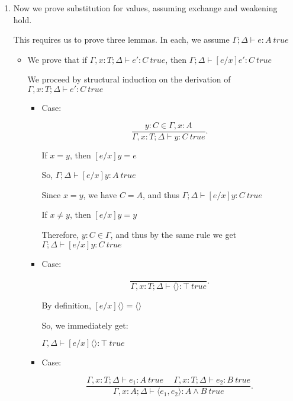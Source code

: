 \begin{enumerate}
      \item
        Now we prove substitution for values, assuming exchange and weakening hold.

        This requires us to prove three lemmas. In each, we assume $\Gamma;\Delta \vdash e: A\ true$

        \begin{itemize}

          \item
            We prove that if $\Gamma, x : T; \Delta \vdash e': C\ true$, then $\Gamma;\Delta \vdash [e / x]e' : C\ true$

            We proceed by structural induction on the derivation of $\Gamma, x : T;\Delta \vdash e': C\ true$

            \begin{itemize}
              \item
                Case:

                \[
                  \frac{y:C \in \Gamma, x: A}{\Gamma, x : T;\Delta \vdash y : C\ true}
                .\] 

                If $x=y$, then $[e / x]y = e$

                So, $\Gamma;\Delta \vdash [e / x]y : A\ true$

                Since $x=y$, we have $C=A$, and thus $\Gamma;\Delta \vdash [e / x]y : C\ true$

                If $x \neq y$, then $[e / x]y = y$

                Therefore, $y: C \in \Gamma$, and thus by the same rule we get $\Gamma;\Delta \vdash [e / x]y : C\ true$

              \item
                Case:

                \[
                  \frac{}{\Gamma, x : T; \Delta \vdash \langle \rangle : \top\ true}
                .\] 

                By definition, $[e / x]\langle \rangle = \langle \rangle$

                So, we immediately get:

                $\Gamma, \Delta \vdash [e / x]\langle \rangle : \top\ true$

              \item
                Case:

                \[
                  \frac{\Gamma, x : T;\Delta \vdash e_1 : A\ true \hspace{15pt}\Gamma, x : T;\Delta\vdash e_2:B\ true}{\Gamma, x: A;\Delta \vdash \langle e_1, e_2 \rangle : A \wedge B\ true}
                .\] 


\end{itemize}
\end{itemize}
\end{enumerate}
